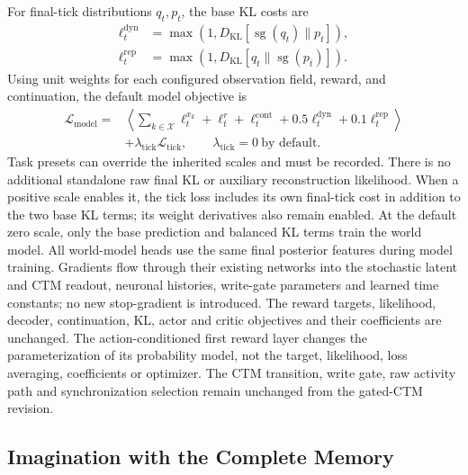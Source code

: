 \documentclass{article}
\begin{document}
For final-tick distributions $q_t,p_t$, the base KL costs are
\begin{align}
\ell_t^{\mathrm{dyn}}&=\max\!\left(1,D_{\mathrm{KL}}[\operatorname{sg}(q_t)\|p_t]\right),
\label{eq:dynamics_kl_loss}\\
\ell_t^{\mathrm{rep}}&=\max\!\left(1,D_{\mathrm{KL}}[q_t\|\operatorname{sg}(p_t)]\right).
\label{eq:representation_kl_loss}
\end{align}
Using unit weights for each configured observation field, reward, and continuation, the default model objective is
\begin{equation}
\begin{split}
\mathcal L_{\mathrm{model}}={}&\left\langle
\sum_{k\in\mathcal X}\ell_t^{x_k}+\ell_t^r+\ell_t^{\mathrm{cont}}
+0.5\ell_t^{\mathrm{dyn}}+0.1\ell_t^{\mathrm{rep}}\right\rangle\\
&+\lambda_{\mathrm{tick}}\mathcal L_{\mathrm{tick}},\qquad\lambda_{\mathrm{tick}}=0\ \text{by default}.
\end{split}
\label{eq:model_loss}
\end{equation}
Task presets can override the inherited scales and must be recorded. There is no additional standalone raw final KL or auxiliary reconstruction likelihood. When a positive scale enables it, the tick loss includes its own final-tick cost in addition to the two base KL terms; its weight derivatives also remain enabled. At the default zero scale, only the base prediction and balanced KL terms train the world model. All world-model heads use the same final posterior features during model training. Gradients flow through their existing networks into the stochastic latent and CTM readout, neuronal histories, write-gate parameters and learned time constants; no new stop-gradient is introduced. The reward targets, likelihood, decoder, continuation, KL, actor and critic objectives and their coefficients are unchanged. The action-conditioned first reward layer changes the parameterization of its probability model, not the target, likelihood, loss averaging, coefficients or optimizer. The CTM transition, write gate, raw activity path and synchronization selection remain unchanged from the gated-CTM revision.

\subsection{Imagination with the Complete Memory}
\end{document}
